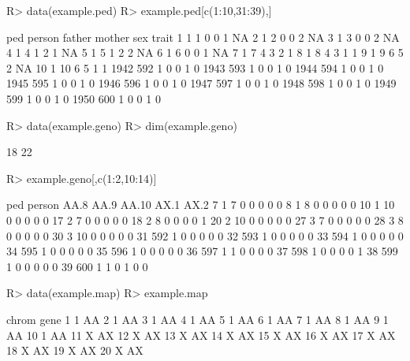 \documentclass[letterpaper]{article}
\begin{document}
\begin{Schunk}
\begin{Sinput}
R> data(example.ped)
R> example.ped[c(1:10,31:39),]
\end{Sinput}
\begin{Soutput}
     ped person father mother sex trait
1      1      1      0      0   1    NA
2      1      2      0      0   2    NA
3      1      3      0      0   2    NA
4      1      4      1      2   1    NA
5      1      5      1      2   2    NA
6      1      6      0      0   1    NA
7      1      7      4      3   2     1
8      1      8      4      3   1     1
9      1      9      6      5   2    NA
10     1     10      6      5   1     1
1942 592      1      0      0   1     0
1943 593      1      0      0   1     0
1944 594      1      0      0   1     0
1945 595      1      0      0   1     0
1946 596      1      0      0   1     0
1947 597      1      0      0   1     0
1948 598      1      0      0   1     0
1949 599      1      0      0   1     0
1950 600      1      0      0   1     0
\end{Soutput}
\begin{Sinput}
R> data(example.geno)
R> dim(example.geno)
\end{Sinput}
\begin{Soutput}
[1] 18 22
\end{Soutput}
\begin{Sinput}
R> example.geno[,c(1:2,10:14)]
\end{Sinput}
\begin{Soutput}
   ped person AA.8 AA.9 AA.10 AX.1 AX.2
7    1      7    0    0     0    0    0
8    1      8    0    0     0    0    0
10   1     10    0    0     0    0    0
17   2      7    0    0     0    0    0
18   2      8    0    0     0    0    1
20   2     10    0    0     0    0    0
27   3      7    0    0     0    0    0
28   3      8    0    0     0    0    0
30   3     10    0    0     0    0    0
31 592      1    0    0     0    0    0
32 593      1    0    0     0    0    0
33 594      1    0    0     0    0    0
34 595      1    0    0     0    0    0
35 596      1    0    0     0    0    0
36 597      1    1    0     0    0    0
37 598      1    0    0     0    0    1
38 599      1    0    0     0    0    0
39 600      1    1    0     1    0    0
\end{Soutput}
\begin{Sinput}
R> data(example.map)
R> example.map
\end{Sinput}
\begin{Soutput}
   chrom gene
1      1   AA
2      1   AA
3      1   AA
4      1   AA
5      1   AA
6      1   AA
7      1   AA
8      1   AA
9      1   AA
10     1   AA
11     X   AX
12     X   AX
13     X   AX
14     X   AX
15     X   AX
16     X   AX
17     X   AX
18     X   AX
19     X   AX
20     X   AX
\end{Soutput}
\end{Schunk}
\end{document}
